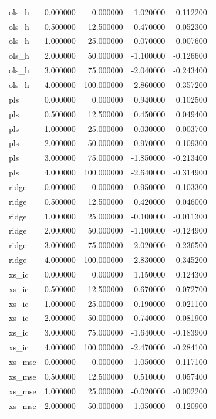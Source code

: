 \begin{table}
\begin{tabular}{lrrrr}
ols\_h & 0.000000 & 0.000000 & 1.020000 & 0.112200 \\
ols\_h & 0.500000 & 12.500000 & 0.470000 & 0.052300 \\
ols\_h & 1.000000 & 25.000000 & -0.070000 & -0.007600 \\
ols\_h & 2.000000 & 50.000000 & -1.100000 & -0.126600 \\
ols\_h & 3.000000 & 75.000000 & -2.040000 & -0.243400 \\
ols\_h & 4.000000 & 100.000000 & -2.860000 & -0.357200 \\
pls & 0.000000 & 0.000000 & 0.940000 & 0.102500 \\
pls & 0.500000 & 12.500000 & 0.450000 & 0.049400 \\
pls & 1.000000 & 25.000000 & -0.030000 & -0.003700 \\
pls & 2.000000 & 50.000000 & -0.970000 & -0.109300 \\
pls & 3.000000 & 75.000000 & -1.850000 & -0.213400 \\
pls & 4.000000 & 100.000000 & -2.640000 & -0.314900 \\
ridge & 0.000000 & 0.000000 & 0.950000 & 0.103300 \\
ridge & 0.500000 & 12.500000 & 0.420000 & 0.046000 \\
ridge & 1.000000 & 25.000000 & -0.100000 & -0.011300 \\
ridge & 2.000000 & 50.000000 & -1.100000 & -0.124900 \\
ridge & 3.000000 & 75.000000 & -2.020000 & -0.236500 \\
ridge & 4.000000 & 100.000000 & -2.830000 & -0.345200 \\
xs\_ic & 0.000000 & 0.000000 & 1.150000 & 0.124300 \\
xs\_ic & 0.500000 & 12.500000 & 0.670000 & 0.072700 \\
xs\_ic & 1.000000 & 25.000000 & 0.190000 & 0.021100 \\
xs\_ic & 2.000000 & 50.000000 & -0.740000 & -0.081900 \\
xs\_ic & 3.000000 & 75.000000 & -1.640000 & -0.183900 \\
xs\_ic & 4.000000 & 100.000000 & -2.470000 & -0.284100 \\
xs\_mse & 0.000000 & 0.000000 & 1.050000 & 0.117100 \\
xs\_mse & 0.500000 & 12.500000 & 0.510000 & 0.057400 \\
xs\_mse & 1.000000 & 25.000000 & -0.020000 & -0.002200 \\
xs\_mse & 2.000000 & 50.000000 & -1.050000 & -0.120900 \\

\end{tabular}
\end{table}
